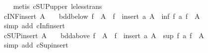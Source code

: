 \begin{isabellebody}
%
\isadelimproof
\ \ %
\endisadelimproof
%
\isatagproof
{}\isamarkupfalse%
\ {\isacharparenleft}{\kern0pt}metis\ cSUP{\isacharunderscore}{\kern0pt}upper\ le{\isacharunderscore}{\kern0pt}less{\isacharunderscore}{\kern0pt}trans{\isacharparenright}{\kern0pt}%
\endisatagproof
{\isafoldproof}%
%
\isadelimproof
\isanewline
%
\endisadelimproof
\isanewline
{}\isamarkupfalse%
\ cINF{\isacharunderscore}{\kern0pt}insert{\isacharcolon}{\kern0pt}\ {\isachardoublequoteopen}A\ {\isasymnoteq}\ {\isacharbraceleft}{\kern0pt}{\isacharbraceright}{\kern0pt}\ {\isasymLongrightarrow}\ bdd{\isacharunderscore}{\kern0pt}below\ {\isacharparenleft}{\kern0pt}f\ {\isacharbackquote}{\kern0pt}\ A{\isacharparenright}{\kern0pt}\ {\isasymLongrightarrow}\ {\isasymSqinter}{\isacharparenleft}{\kern0pt}f\ {\isacharbackquote}{\kern0pt}\ insert\ a\ A{\isacharparenright}{\kern0pt}\ {\isacharequal}{\kern0pt}\ inf\ {\isacharparenleft}{\kern0pt}f\ a{\isacharparenright}{\kern0pt}\ {\isacharparenleft}{\kern0pt}{\isasymSqinter}{\isacharparenleft}{\kern0pt}f\ {\isacharbackquote}{\kern0pt}\ A{\isacharparenright}{\kern0pt}{\isacharparenright}{\kern0pt}{\isachardoublequoteclose}\isanewline
%
\isadelimproof
\ \ %
\endisadelimproof
%
\isatagproof
{}\isamarkupfalse%
\ {\isacharparenleft}{\kern0pt}simp\ add{\isacharcolon}{\kern0pt}\ cInf{\isacharunderscore}{\kern0pt}insert{\isacharparenright}{\kern0pt}%
\endisatagproof
{\isafoldproof}%
%
\isadelimproof
\isanewline
%
\endisadelimproof
\isanewline
{}\isamarkupfalse%
\ cSUP{\isacharunderscore}{\kern0pt}insert{\isacharcolon}{\kern0pt}\ {\isachardoublequoteopen}A\ {\isasymnoteq}\ {\isacharbraceleft}{\kern0pt}{\isacharbraceright}{\kern0pt}\ {\isasymLongrightarrow}\ bdd{\isacharunderscore}{\kern0pt}above\ {\isacharparenleft}{\kern0pt}f\ {\isacharbackquote}{\kern0pt}\ A{\isacharparenright}{\kern0pt}\ {\isasymLongrightarrow}\ {\isasymSqunion}{\isacharparenleft}{\kern0pt}f\ {\isacharbackquote}{\kern0pt}\ insert\ a\ A{\isacharparenright}{\kern0pt}\ {\isacharequal}{\kern0pt}\ sup\ {\isacharparenleft}{\kern0pt}f\ a{\isacharparenright}{\kern0pt}\ {\isacharparenleft}{\kern0pt}{\isasymSqunion}{\isacharparenleft}{\kern0pt}f\ {\isacharbackquote}{\kern0pt}\ A{\isacharparenright}{\kern0pt}{\isacharparenright}{\kern0pt}{\isachardoublequoteclose}\isanewline
%
\isadelimproof
\ \ %
\endisadelimproof
%
\isatagproof
{}\isamarkupfalse%
\ {\isacharparenleft}{\kern0pt}simp\ add{\isacharcolon}{\kern0pt}\ cSup{\isacharunderscore}{\kern0pt}insert{\isacharparenright}{\kern0pt}%
\endisatagproof
{\isafoldproof}%
%
\isadelimproof

\end{isabellebody}
